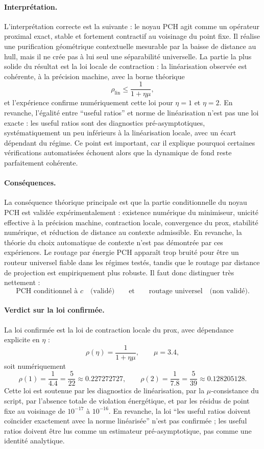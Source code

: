 \paragraph{Interprétation.}
L’interprétation correcte est la suivante : le noyau PCH agit comme un opérateur proximal exact, stable et fortement contractif au voisinage du point fixe. Il réalise une purification géométrique contextuelle mesurable par la baisse de distance au hull, mais il ne crée pas à lui seul une séparabilité universelle. La partie la plus solide du résultat est la loi locale de contraction : la linéarisation observée est cohérente, à la précision machine, avec la borne théorique
\[
\rho_{\mathrm{lin}}\le \frac{1}{1+\eta\mu},
\]
et l’expérience confirme numériquement cette loi pour \(\eta=1\) et \(\eta=2\). En revanche, l’égalité entre “useful ratios” et norme de linéarisation n’est pas une loi exacte : les useful ratios sont des diagnostics pré-asymptotiques, systématiquement un peu inférieurs à la linéarisation locale, avec un écart dépendant du régime. Ce point est important, car il explique pourquoi certaines vérifications automatisées échouent alors que la dynamique de fond reste parfaitement cohérente. 

\paragraph{Conséquences.}
La conséquence théorique principale est que la partie conditionnelle du noyau PCH est validée expérimentalement : existence numérique du minimiseur, unicité effective à la précision machine, contraction locale, convergence du prox, stabilité numérique, et réduction de distance au contexte admissible. En revanche, la théorie du choix automatique de contexte n’est pas démontrée par ces expériences. Le routage par énergie PCH apparaît trop bruité pour être un routeur universel fiable dans les régimes testés, tandis que le routage par distance de projection est empiriquement plus robuste. Il faut donc distinguer très nettement :
\[
\text{PCH conditionnel à }c
\quad\text{(validé)}
\qquad\text{et}\qquad
\text{routage universel}
\quad\text{(non validé).}
\]

\paragraph{Verdict sur la loi confirmée.}
La loi confirmée est la loi de contraction locale du prox, avec dépendance explicite en \(\eta\) :
\[
\rho(\eta)=\frac{1}{1+\eta\mu},
\qquad
\mu=3.4,
\]
soit numériquement
\[
\rho(1)=\frac{1}{4.4}=\frac{5}{22}\approx 0.227272727,
\qquad
\rho(2)=\frac{1}{7.8}=\frac{5}{39}\approx 0.128205128.
\]
Cette loi est soutenue par les diagnostics de linéarisation, par la \(\mu\)-consistance du script, par l’absence totale de violation énergétique, et par les résidus de point fixe au voisinage de \(10^{-17}\) à \(10^{-16}\). En revanche, la loi “les useful ratios doivent coïncider exactement avec la norme linéarisée” n’est pas confirmée ; les useful ratios doivent être lus comme un estimateur pré-asymptotique, pas comme une identité analytique.




